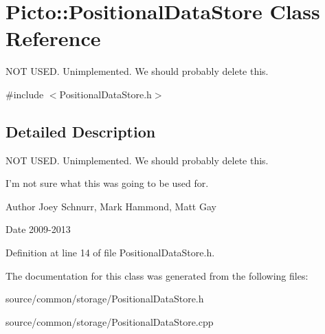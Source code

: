 \hypertarget{class_picto_1_1_positional_data_store}{\section{Picto\-:\-:Positional\-Data\-Store Class Reference}
\label{class_picto_1_1_positional_data_store}
}


N\-O\-T U\-S\-E\-D. Unimplemented. We should probably delete this.  




{\ttfamily \#include $<$Positional\-Data\-Store.\-h$>$}



\subsection{Detailed Description}
N\-O\-T U\-S\-E\-D. Unimplemented. We should probably delete this. 

I'm not sure what this was going to be used for. \begin{DoxyAuthor}{Author}
Joey Schnurr, Mark Hammond, Matt Gay 
\end{DoxyAuthor}
\begin{DoxyDate}{Date}
2009-\/2013 
\end{DoxyDate}


Definition at line 14 of file Positional\-Data\-Store.\-h.



The documentation for this class was generated from the following files\-:\begin{DoxyCompactItemize}
\item 
source/common/storage/Positional\-Data\-Store.\-h\item 
source/common/storage/Positional\-Data\-Store.\-cpp\end{DoxyCompactItemize}
